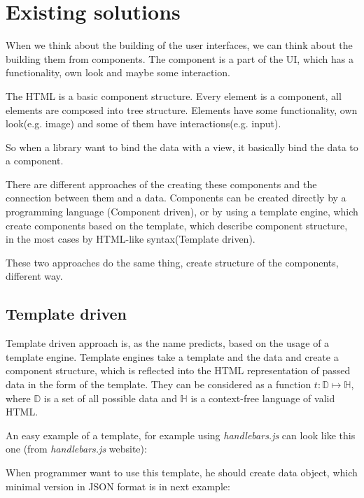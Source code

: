 \chapter{Existing solutions}\label{chap:existing}

When we think about the building of the user interfaces, we can think about the building them from components.
The component is a part of the UI, which has a functionality, own look and maybe some interaction.

The HTML is a basic component structure. Every element is a component, all elements are composed into tree structure. 
Elements have some functionality, own look(e.g. image) and some of them have interactions(e.g. input).

So when a library want to bind the data with a view, it basically bind the data to a component.

There are different approaches of the creating these components and the connection between them and a data. 
Components can be created directly by a programming language (Component driven), 
or by using a template engine, which create components based on the template, 
which describe component structure, in the most cases by HTML-like syntax(Template driven).

These two approaches do the same thing, create structure of the components, different way.

\section{Template driven}\label{sec:existing-template}

	Template driven approach is, as the name predicts, based on the usage of a template engine. 
	Template engines take a template and the data and create a component structure, 
	which is reflected into the HTML representation of passed data in the form of the template. 
	They can be considered as a function $t:\mathbb D\mapsto\mathbb H$, 
	where $\mathbb D$ is a set of all possible data and $\mathbb H$ is a context-free language of valid HTML.

	An easy example of a template, for example using \textit{handlebars.js} can look like this one (from \textit{handlebars.js} website):
  

	When programmer want to use this template, he should create data object, which minimal version in JSON format is in next example:
  

